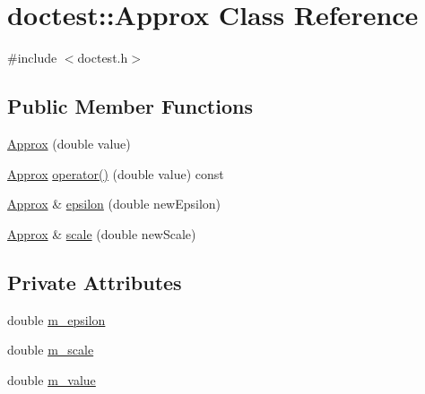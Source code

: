 \hypertarget{classdoctest_1_1Approx}{}\section{doctest\+:\+:Approx Class Reference}
\label{classdoctest_1_1Approx}


{\ttfamily \#include $<$doctest.\+h$>$}

\subsection*{Public Member Functions}
\begin{DoxyCompactItemize}
\item 
\hyperlink{classdoctest_1_1Approx_a86f0d1b44c1cf095697f23ccdab00802}{Approx} (double value)
\item 
\hyperlink{classdoctest_1_1Approx}{Approx} \hyperlink{classdoctest_1_1Approx_aae907c5ea1c4ac94e134db9e35da7dce}{operator()} (double value) const
\item 
\hyperlink{classdoctest_1_1Approx}{Approx} \& \hyperlink{classdoctest_1_1Approx_af8df6b0af00fd875e5b6a0c30b86f636}{epsilon} (double new\+Epsilon)
\item 
\hyperlink{classdoctest_1_1Approx}{Approx} \& \hyperlink{classdoctest_1_1Approx_a62185fd4c09a63dab61bd893574d8473}{scale} (double new\+Scale)
\end{DoxyCompactItemize}
\subsection*{Private Attributes}
\begin{DoxyCompactItemize}
\item 
double \hyperlink{classdoctest_1_1Approx_a332ac911453d1289f81bc36068e2bb97}{m\+\_\+epsilon}
\item 
double \hyperlink{classdoctest_1_1Approx_aa313c36a9170e7e3157e390a8839396d}{m\+\_\+scale}
\item 
double \hyperlink{classdoctest_1_1Approx_af29d79bf1986ba565a688cb97b10efd4}{m\+\_\+value}
\end{DoxyCompactItemize}
